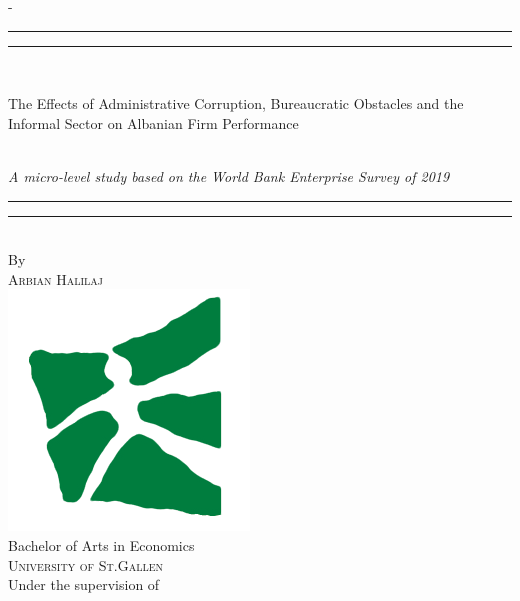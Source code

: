 %
%

\begin{titlingpage}
\begin{SingleSpace}
\calccentering{\unitlength} 
\begin{adjustwidth*}{\unitlength}{-\unitlength}
\vspace*{1mm}
\begin{center}
\rule[0.5ex]{\linewidth}{2pt}\vspace*{-\baselineskip}\vspace*{3.2pt}
\rule[0.5ex]{\linewidth}{1pt}\\[\baselineskip]
{\HUGE The Effects of Administrative Corruption, Bureaucratic Obstacles and the Informal Sector on Albanian Firm Performance \par}\\[4mm]
{\Large \textit{A micro-level study based on the World Bank Enterprise Survey of 2019}}\\
\rule[0.5ex]{\linewidth}{1pt}\vspace*{-\baselineskip}\vspace{3.2pt}
\rule[0.5ex]{\linewidth}{2pt}\\
\vspace{6.5mm}
{\large By}\\
\vspace{6.5mm}
{\large\textsc{Arbian Halilaj}}\\
\vspace{6mm}
\includegraphics[scale=0.6]{logos/unisg}\\
\vspace{6mm}
{\large Bachelor of Arts in Economics\\
\textsc{University of St.Gallen}}\\
\vspace{6mm}
{\large Under the supervision of \\
}
\end{center}
\end{adjustwidth*}
\end{SingleSpace}
\end{titlingpage}
